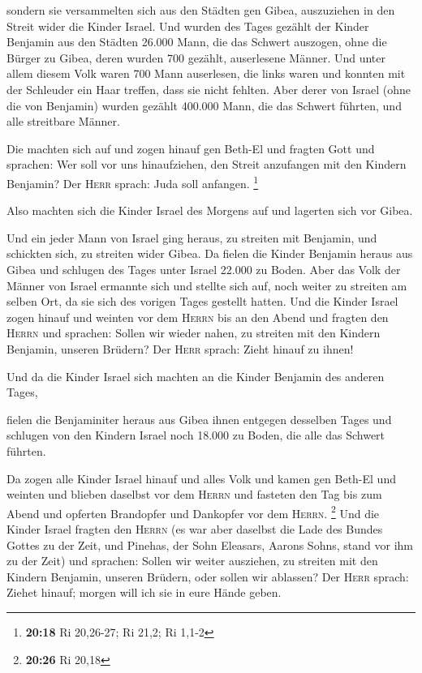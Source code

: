  sondern sie versammelten sich aus den Städten gen Gibea,
auszuziehen in den Streit wider die Kinder Israel.  Und
wurden des Tages gezählt der Kinder Benjamin aus den Städten 26.000
Mann, die das Schwert auszogen, ohne die Bürger zu Gibea, deren wurden
700 gezählt, auserlesene Männer.  Und unter allem diesem
Volk waren 700 Mann auserlesen, die links waren und konnten mit der
Schleuder ein Haar treffen, dass sie nicht fehlten.  Aber
derer von Israel (ohne die von Benjamin) wurden gezählt 400.000 Mann,
die das Schwert führten, und alle streitbare Männer.

 Die machten sich auf und zogen hinauf gen Beth-El und
fragten Gott und sprachen: Wer soll vor uns hinaufziehen, den Streit
anzufangen mit den Kindern Benjamin? Der \textsc{Herr} sprach: Juda soll
anfangen. \footnote{\textbf{20:18} Ri 20,26-27; Ri 21,2; Ri 1,1-2}

 Also machten sich die Kinder Israel des Morgens auf und
lagerten sich vor Gibea.

 Und ein jeder Mann von Israel ging heraus, zu streiten
mit Benjamin, und schickten sich, zu streiten wider Gibea.
 Da fielen die Kinder Benjamin heraus aus Gibea und
schlugen des Tages unter Israel 22.000 zu Boden.  Aber
das Volk der Männer von Israel ermannte sich und stellte sich auf, noch
weiter zu streiten am selben Ort, da sie sich des vorigen Tages gestellt
hatten.  Und die Kinder Israel zogen hinauf und weinten
vor dem \textsc{Herrn} bis an den Abend und fragten den \textsc{Herrn}
und sprachen: Sollen wir wieder nahen, zu streiten mit den Kindern
Benjamin, unseren Brüdern? Der \textsc{Herr} sprach: Zieht hinauf zu
ihnen!

 Und da die Kinder Israel sich machten an die Kinder
Benjamin des anderen Tages,

 fielen die Benjaminiter heraus aus Gibea ihnen entgegen
desselben Tages und schlugen von den Kindern Israel noch 18.000 zu
Boden, die alle das Schwert führten.

 Da zogen alle Kinder Israel hinauf und alles Volk und
kamen gen Beth-El und weinten und blieben daselbst vor dem
\textsc{Herrn} und fasteten den Tag bis zum Abend und opferten
Brandopfer und Dankopfer vor dem \textsc{Herrn}. \footnote{\textbf{20:26}
  Ri 20,18}  Und die Kinder Israel fragten den
\textsc{Herrn} (es war aber daselbst die Lade des Bundes Gottes zu der
Zeit,  und Pinehas, der Sohn Eleasars, Aarons Sohns,
stand vor ihm zu der Zeit) und sprachen: Sollen wir weiter ausziehen, zu
streiten mit den Kindern Benjamin, unseren Brüdern, oder sollen wir
ablassen? Der \textsc{Herr} sprach: Ziehet hinauf; morgen will ich sie
in eure Hände geben.

